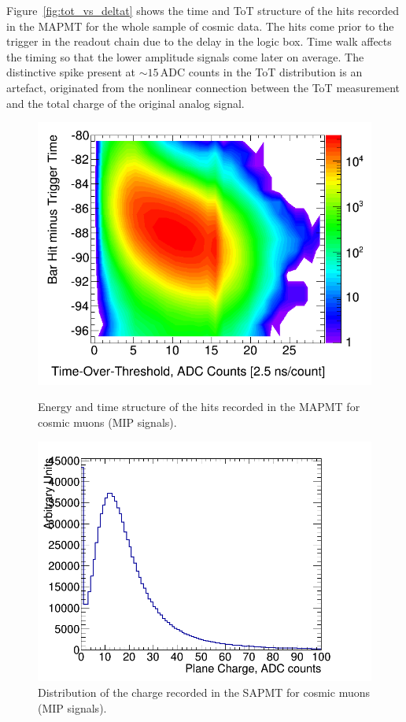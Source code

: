 \documentclass[a4paper,11pt]{article}
\begin{document}
Figure~\ref{fig:tot_vs_deltat} shows the time and ToT structure of the hits recorded in the MAPMT for the whole sample of cosmic data. The hits
come prior to the trigger in the readout chain due to the delay in the logic box. Time walk affects the timing so that the lower amplitude signals come
later on average. The distinctive spike present at $\sim15$\,ADC counts in the ToT distribution is an artefact, originated from the nonlinear connection
between the ToT measurement and the total charge of the original analog signal.

\begin{figure}
 \centering
 \begin{minipage}[b]{.49\textwidth}
  \centering
  \includegraphics[width=.9\textwidth]{tot_vs_deltat_log_scale_2D.png}
  \caption{Energy and time structure of the hits recorded in the MAPMT for cosmic muons (MIP signals).}
  \label{fig:tot_vs_deltat}
 \end{minipage}
 \hfill
 \begin{minipage}[b]{.49\textwidth}
  \centering
  \includegraphics[width=\textwidth]{plane_charge_hist.png}
  \vspace{1mm}
  \caption{Distribution of the charge recorded in the SAPMT for cosmic muons (MIP signals).}
  \label{fig:plane_charge}
 \end{minipage}
\end{figure} 
\end{document}
